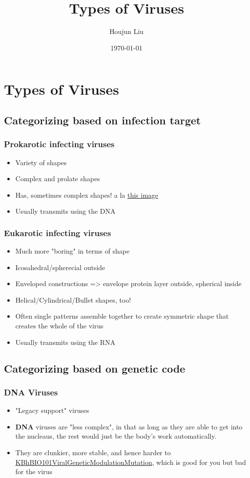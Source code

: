 \documentclass[letterpaper]{article}
\author{Houjun Liu}
\date{\today}
\title{Types of Viruses}
\renewcommand{\tableofcontents}{}
\begin{document}
\tableofcontents



\section{Types of Viruses}
\label{sec:orgc3b73fa}
\subsection{Categorizing based on infection target}
\label{sec:org2f7c270}
\subsubsection{Prokarotic infecting viruses}
\label{sec:orge14da91}
\begin{itemize}
\item Variety of shapes
\item Complex and prolate shapes
\item Has, sometimes complex shapes! a la
\href{Screen Shot 2020-10-12 at 10.49.04 PM.png}{this
image}
\item Usually transmits using the DNA
\end{itemize}

\subsubsection{Eukarotic infecting viruses}
\label{sec:org675bca7}
\begin{itemize}
\item Much more "boring" in terms of shape
\item Icosahedral/spherecial outside
\item Enveloped constructions => envelope protein layer outside, spherical
inside
\item Helical/Cylindrical/Bullet shapes, too!
\item Often single patterns assemble together to create symmetric shape that
creates the whole of the virus
\item Usually transmits using the RNA
\end{itemize}

\subsection{Categorizing based on genetic code}
\label{sec:orgfad1a5d}
\subsubsection{DNA Viruses}
\label{sec:org79bc7fa}
\begin{itemize}
\item "Legacy support" viruses
\item \textbf{DNA} viruses are "less complex", in that as long as they are able to
get into the nucleaus, the rest would just be the body's work
automatically.
\item They are clunkier, more stable, and hence harder to
\href{KBhBIO101ViralGeneticModulationMutation.org}{KBhBIO101ViralGeneticModulationMutation},
which is good for you but bad for the virus
\end{itemize}
\end{document}

